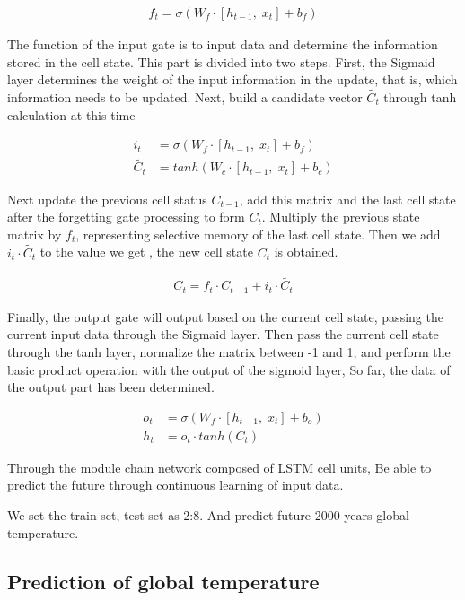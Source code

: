 \documentclass{apmcmthesis}
\begin{document}
  \begin{align*}
    f_t = \sigma (W_f \cdot [h_{t-1},\; x_t] + b_f)
  \end{align*}
  
  The function of the input gate is to input data and determine the information stored in the cell state.
  This part is divided into two steps. First, the Sigmaid layer determines the weight of the input information in the update, that is, which information needs to be updated.
  Next, build a candidate vector $\tilde{C_t}$ through tanh calculation at this time
  
  \begin{align*}
    i_t &= \sigma (W_f \cdot [h_{t-1},\; x_t] + b_f)\\
    \tilde{C_t}&= tanh(W_c \cdot [h_{t-1},\; x_t] + b_c)
  \end{align*}
  
  Next update the previous cell status $C_{t-1}$, add this matrix and the last cell state after the forgetting gate processing to form $C_t$.
  Multiply the previous state matrix by $f_t$, representing selective memory of the last cell state.
  Then we add $i_t\cdot \tilde{C_t} $ to the value we get  , the new cell state $C_t$ is obtained.
  
  \begin{align*}
    C_t = f_t \cdot C_{t-1} + i_t \cdot \tilde{C_t}
  \end{align*}
  
  Finally, the output gate will output based on the current cell state, passing the current input data through the Sigmaid layer.
  Then pass the current cell state through the tanh layer, normalize the matrix between -1 and 1, and perform the basic product operation with the output of the sigmoid layer,
  So far, the data of the output part has been determined.
  
  \begin{align*}
    o_t &= \sigma (W_f \cdot [h_{t-1},\; x_t] + b_o)\\
    h_t &= o_t \cdot tanh (C_t)
  \end{align*}
  
  Through the module chain network composed of LSTM cell units,
  Be able to predict the future through continuous learning of input data.
  
  We set the train set, test set as 2:8.
  And predict future 2000 years global temperature.
  
  
  \subsection{Prediction of global temperature}
  
\end{document}
